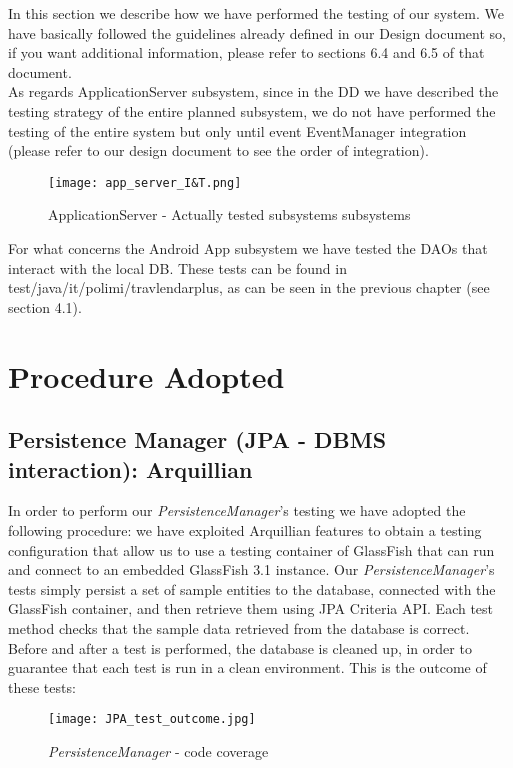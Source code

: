 In this section we describe how we have performed the testing of our system.
We have basically followed the guidelines already defined in our Design document so, if you want additional information, please refer to sections 6.4 and 6.5 of that document. \\
As regards ApplicationServer subsystem, since in the DD we have described the testing strategy of the entire planned subsystem, we do not have performed the testing of the entire system but only until event EventManager integration (please refer to our design document to see the order of integration).\\
\begin{figure}[H]
	\begin{center}
		\hspace*{-40pt}
		\texttt{[image: app\_server\_I\&T.png]}
	\end{center}
\caption{ ApplicationServer - Actually tested subsystems subsystems}
\end{figure}
\newpage \noindent
For what concerns the Android App subsystem we have tested the DAOs that interact with the local DB. These tests can be found in test/java/it/polimi/travlendarplus, as can be seen in the previous chapter (see section 4.1).

\section{Procedure Adopted}
\subsection{Persistence Manager (JPA - DBMS interaction): Arquillian}
In order to perform our \textit{PersistenceManager}'s testing we have adopted the following procedure: we have exploited Arquillian features to obtain a testing configuration that allow us to use a testing container of GlassFish that can run and connect to an embedded GlassFish 3.1 instance.
Our \textit{PersistenceManager}'s tests simply  persist a set of sample entities to the database, connected with the GlassFish container, and then retrieve them using JPA Criteria API.
Each test method checks that the sample data retrieved from the database is correct. Before and after a test is performed, the database is cleaned up, in order to guarantee that each test is run in a clean environment.
This is the outcome of these tests:
\begin{figure}[H]
	\begin{center}
		\texttt{[image: JPA\_test\_outcome.jpg]}
	\end{center}
\caption{ \textit{PersistenceManager} - code coverage}
\end{figure}

